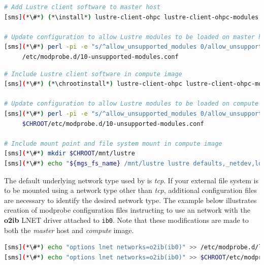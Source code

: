 \documentclass[letterpaper]{article}
\newcommand{\install}{zypper -n install}
\newcommand{\chrootinstall}{zypper -n --root \$CHROOT install}
\begin{document}

\begin{lstlisting}[language=bash,keywords={},upquote=true]
# Add Lustre client software to master host
[sms](*\#*) (*\install*) lustre-client-ohpc lustre-client-ohpc-modules

# Update configuration to allow Lustre modules to be loaded on master host
[sms](*\#*) perl -pi -e "s/^allow_unsupported_modules 0/allow_unsupported_modules 1/" \
     /etc/modprobe.d/10-unsupported-modules.conf
\end{lstlisting}

\clearpage
\begin{lstlisting}[language=bash,keywords={},upquote=true]
# Include Lustre client software in compute image
[sms](*\#*) (*\chrootinstall*) lustre-client-ohpc lustre-client-ohpc-modules

# Update configuration to allow Lustre modules to be loaded on compute hosts
[sms](*\#*) perl -pi -e "s/^allow_unsupported_modules 0/allow_unsupported_modules 1/" \
     $CHROOT/etc/modprobe.d/10-unsupported-modules.conf

# Include mount point and file system mount in compute image
[sms](*\#*) mkdir $CHROOT/mnt/lustre
[sms](*\#*) echo "${mgs_fs_name} /mnt/lustre lustre defaults,_netdev,localflock 0 0" >> $CHROOT/etc/fstab
\end{lstlisting}



The default underlying network type used by \Lustre{} is {\em tcp}. If your
external \Lustre{} file system is to be mounted using a network type other than
{\em tcp}, additional configuration files are necessary to identify the desired
network type. The example below illustrates creation of modprobe configuration files
instructing \Lustre{} to use an \InfiniBand{} network with the \textbf{o2ib} LNET driver
attached to \texttt{ib0}. Note that these modifications are made to both the
{\em master} host and {\em compute} image.

\begin{lstlisting}[language=bash,keywords={},upquote=true]
[sms](*\#*) echo "options lnet networks=o2ib(ib0)" >> /etc/modprobe.d/lustre.conf
[sms](*\#*) echo "options lnet networks=o2ib(ib0)" >> $CHROOT/etc/modprobe.d/lustre.conf
\end{lstlisting}
\end{document}

